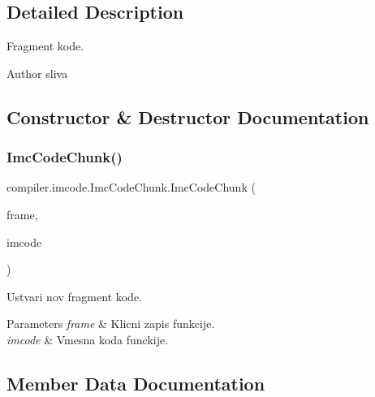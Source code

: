 \subsection{Detailed Description}
Fragment kode.

\begin{DoxyAuthor}{Author}
sliva 
\end{DoxyAuthor}


\subsection{Constructor \& Destructor Documentation}
\mbox{\label{classcompiler_1_1imcode_1_1_imc_code_chunk_a8245b30d5f97a969ad274dd4071a6988}} 
\subsubsection{\texorpdfstring{Imc\+Code\+Chunk()}{ImcCodeChunk()}}
{\footnotesize\ttfamily compiler.\+imcode.\+Imc\+Code\+Chunk.\+Imc\+Code\+Chunk (\begin{DoxyParamCaption}\item[{\hyperlink{classcompiler_1_1frames_1_1_frm_frame}{Frm\+Frame}}]{frame,  }\item[{\hyperlink{classcompiler_1_1imcode_1_1_imc_stmt}{Imc\+Stmt}}]{imcode }\end{DoxyParamCaption})}

Ustvari nov fragment kode.


\begin{DoxyParams}{Parameters}
{\em frame} & Klicni zapis funkcije. \\
\hline
{\em imcode} & Vmesna koda funckije. \\
\hline
\end{DoxyParams}


\subsection{Member Data Documentation}
\mbox{\label{classcompiler_1_1imcode_1_1_imc_code_chunk_a91523ee46e370e198d47b6626519dc06}} 
